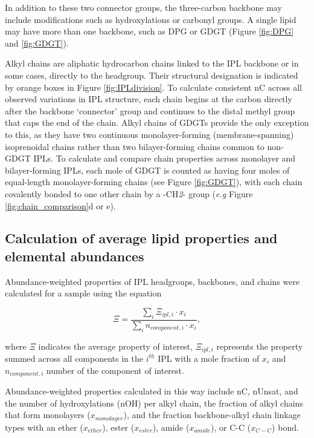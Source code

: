In addition to these two connector groups, the three-carbon backbone may include modifications such as hydroxylations or carbonyl groups. A single lipid may have more than one backbone, such as DPG or GDGT (Figure \ref{fig:DPG} and \ref{fig:GDGT}). 

Alkyl chains are aliphatic hydrocarbon chains linked to the IPL backbone or in some cases, directly to the headgroup. Their structural designation is indicated by orange boxes in Figure \ref{fig:IPLdivision}. To calculate consistent nC across all observed variations in IPL structure, each chain begins at the carbon directly after the backbone `connector' group and continues to the distal methyl group that caps the end of the chain. Alkyl chains of GDGTs provide the only exception to this, as they have two continuous monolayer-forming (membrane-spanning) isoprenoidal chains rather than two bilayer-forming chains common to non-GDGT IPLs. To calculate and compare chain properties across monolayer and bilayer-forming IPLs, each mole of GDGT is counted as having four moles of equal-length monolayer-forming chains (see Figure \ref{fig:GDGT}), with each chain covalently bonded to one other chain by a -CH\textit{2}- group (\textit{e.g} Figure \ref{fig:chain_comparison}d or e).





\subsection{Calculation of average lipid properties and elemental abundances}
Abundance-weighted properties of IPL headgroups, backbones, and chains were calculated for a sample using the equation

\begin{equation} \label{eq:avecomponent}
\Xi = \frac{\sum_{i} \Xi_{ipl,i} \cdot x_{i}}{\sum_{i} n_{component,i} \cdot x_{i}},
\end{equation}

\noindent where $\Xi$ indicates the average property of interest, $\Xi_{ipl,i}$ represents the property summed across all components in the $i^{th}$ IPL with a mole fraction of $x_{i}$ and $n_{component,i}$ number of the component of interest.

Abundance-weighted properties calculated in this way include nC, nUnsat, and the number of hydroxylations (nOH) per alkyl chain, the fraction of alkyl chains that form monolayers ($x_{monolayer}$), and the fraction backbone-alkyl chain linkage types with an ether ($x_{ether}$), ester ($x_{ester}$), amide ($x_{amide}$), or C-C ($x_{C-C}$) bond.

